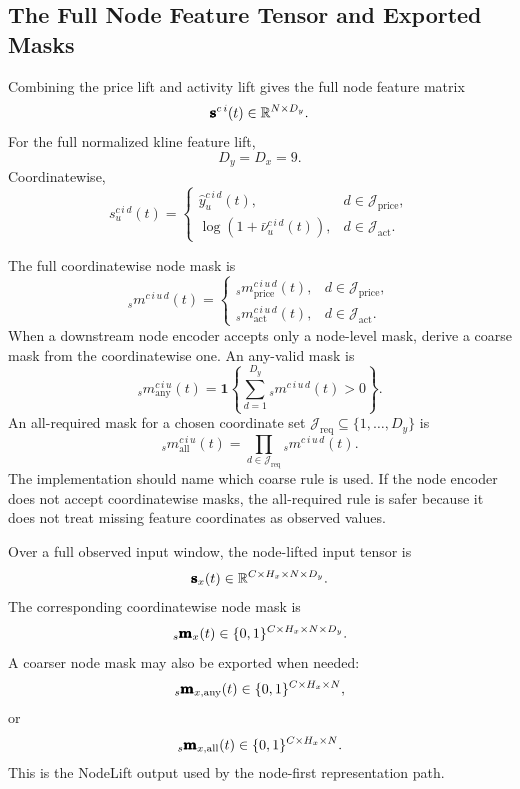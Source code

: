 \subsection{The Full Node Feature Tensor and Exported Masks}
\label{subsec:full-node-feature-tensor-and-exported-masks}

Combining the price lift and activity lift gives the full node feature matrix
\[
  \pmb{\mathbf{s}}^{c\,i}(t)
  \in
  \mathbb{R}^{N\times D_y}.
\]
For the full normalized kline feature lift,
\[
  D_y=D_x=9.
\]
Coordinatewise,
\[
  s_u^{c\,i\,d}(t)
  =
  \begin{cases}
    \widehat{y}_{u}^{c\,i\,d}(t),
    & d\in\mathcal{J}_{\mathrm{price}},\\[0.8em]
    \log
    \left(
      1+\bar{\nu}_{u}^{c\,i\,d}(t)
    \right),
    & d\in\mathcal{J}_{\mathrm{act}}.
  \end{cases}
\]

The full coordinatewise node mask is
\[
  {}_{s}m^{c\,i\,u\,d}(t)
  =
  \begin{cases}
    {}_{s}m_{\mathrm{price}}^{c\,i\,u\,d}(t),
    & d\in\mathcal{J}_{\mathrm{price}},\\[0.6em]
    {}_{s}m_{\mathrm{act}}^{c\,i\,u\,d}(t),
    & d\in\mathcal{J}_{\mathrm{act}}.
  \end{cases}
\]
When a downstream node encoder accepts only a node-level mask, derive a coarse
mask from the coordinatewise one.  An any-valid mask is
\[
  {}_{s}m_{\mathrm{any}}^{c\,i\,u}(t)
  =
  \mathbf{1}
  \left\{
    \sum_{d=1}^{D_y}
    {}_{s}m^{c\,i\,u\,d}(t)
    >
    0
  \right\}.
\]
An all-required mask for a chosen coordinate set
$\mathcal{J}_{\mathrm{req}}\subseteq\{1,\ldots,D_y\}$ is
\[
  {}_{s}m_{\mathrm{all}}^{c\,i\,u}(t)
  =
  \prod_{d\in\mathcal{J}_{\mathrm{req}}}
  {}_{s}m^{c\,i\,u\,d}(t).
\]
The implementation should name which coarse rule is used.  If the node encoder
does not accept coordinatewise masks, the all-required rule is safer because it
does not treat missing feature coordinates as observed values.

Over a full observed input window, the node-lifted input tensor is
\[
  \pmb{\mathbf{s}}_{x}(t)
  \in
  \mathbb{R}^{C\times H_x\times N\times D_y}.
\]
The corresponding coordinatewise node mask is
\[
  {}_{s}\pmb{\mathbf{m}}_{x}(t)
  \in
  \{0,1\}^{C\times H_x\times N\times D_y}.
\]
A coarser node mask may also be exported when needed:
\[
  {}_{s}\pmb{\mathbf{m}}_{x,\mathrm{any}}(t)
  \in
  \{0,1\}^{C\times H_x\times N},
\]
or
\[
  {}_{s}\pmb{\mathbf{m}}_{x,\mathrm{all}}(t)
  \in
  \{0,1\}^{C\times H_x\times N}.
\]
This is the NodeLift output used by the node-first representation path.

